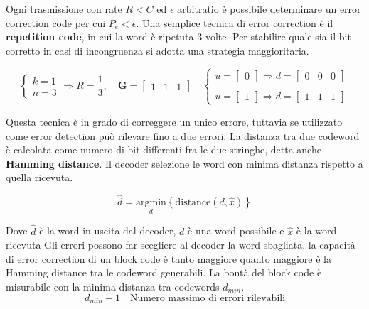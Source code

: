 Ogni trasmissione con rate $R < C$ ed $\epsilon$ arbitratio è possibile determinare un error correction code per cui $P_e < \epsilon$.
Una semplice tecnica di error correction è il \textbf{repetition code}, in cui la word è ripetuta 3 volte. 
Per stabilire quale sia il bit corretto in casi di incongruenza si adotta una strategia maggioritaria.


\[
    \begin{cases}
        k = 1 \\
        n = 3 
    \end{cases}
    \Rightarrow R = \frac{1}{3},
    \quad \mathbf{G} =
    \begin{bmatrix}
        1 & 1 & 1
    \end{bmatrix}
    \quad 
    \begin{cases}
        u = \begin{bmatrix}0\end{bmatrix} \Rightarrow d = \begin{bmatrix}0 & 0 & 0\end{bmatrix} \\
        \\
        u = \begin{bmatrix}1\end{bmatrix} \Rightarrow d = \begin{bmatrix}1 & 1 & 1\end{bmatrix}
    \end{cases}
\]


Questa tecnica è in grado di correggere un unico errore, tuttavia se utilizzato come error detection può rilevare fino a due errori.
La distanza tra due codeword è calcolata come numero di bit differenti fra le due stringhe, detta anche \textbf{Hamming distance}. Il decoder selezione le word con minima distanza rispetto a quella ricevuta.

\[
    \hat{d} = \underset{d}{\mathrm{argmin}} \left\{\text{distance}(d, \hat{x})\right\}
\]

Dove $\hat{d}$ è la word in uscita dal decoder, $d$ è una word possibile e $\hat{x}$ è la word ricevuta
Gli errori possono far scegliere al decoder la word sbagliata, la capacità di error correction di un block code è tanto maggiore quanto maggiore è la Hamming distance tra le codeword generabili. La bontà del block code è misurabile con la minima distanza tra codewords $d_{min}$.
\[
    d_{min} - 1 \quad \text{Numero massimo di errori rilevabili}
\]

